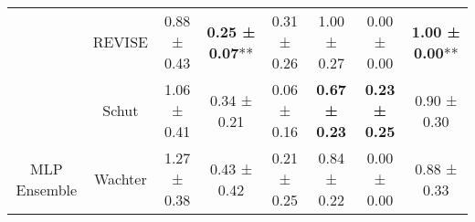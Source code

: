 \begin{table}
{\begin{tabular}[t]{cccccccc}
 & REVISE & 0.88 ± 0.43\hphantom{*}\hphantom{*} & \textbf{0.25 ± 0.07}** & 0.31 ± 0.26\hphantom{*}\hphantom{*} & 1.00 ± 0.27\hphantom{*}\hphantom{*} & 0.00 ± 0.00\hphantom{*}\hphantom{*} & \textbf{1.00 ± 0.00}**\\

 & Schut & 1.06 ± 0.41\hphantom{*}\hphantom{*} & 0.34 ± 0.21\hphantom{*}\hphantom{*} & 0.06 ± 0.16\hphantom{*}\hphantom{*} & \textbf{0.67 ± 0.23}\hphantom{*}\hphantom{*} & \textbf{0.23 ± 0.25}\hphantom{*}\hphantom{*} & 0.90 ± 0.30\hphantom{*}\hphantom{*}\\

\multirow[t]{-9}{*}{\centering\arraybackslash MLP Ensemble} & Wachter & 1.27 ± 0.38\hphantom{*}\hphantom{*} & 0.43 ± 0.42\hphantom{*}\hphantom{*} & 0.21 ± 0.25\hphantom{*}\hphantom{*} & 0.84 ± 0.22\hphantom{*}\hphantom{*} & 0.00 ± 0.00\hphantom{*}\hphantom{*} & 0.88 ± 0.33\hphantom{*}\hphantom{*}\\
\bottomrule
\end{tabular}}
\end{table}
